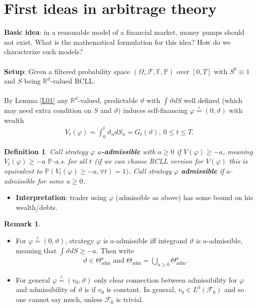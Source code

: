 \documentclass[12pt,a4paper, twoside]{article}
\newtheorem{defn}{Definition}[section]
\theoremstyle{definition}
\newtheorem{rem}{Remark}[section]
\newcommand{\PP}{\mathbb{P}} %
\newcommand{\teq}{\overset{\wedge}{=}}
\begin{document}
\section{First ideas in arbitrage theory}
\textbf{Basic idea}: in a reasonable model of a financial market, money pumps should not exist. What is the mathematical formulation for this idea? How do we characterize such models?\\
\\
\textbf{Setup}: Given a filtered probability space $( \Omega, \mathcal{F}, \mathbb{F}, \PP)$ over $[0,T]$ with $S^0 \equiv 1$ and $S$ being $\mathbb{R}^d$-valued RCLL. 
\\\\
By Lemma \ref{L01} any $\mathbb{R}^d$-valued, predictable $\vartheta$ with $\int \vartheta dS$ well defined (which may need extra condition on $S$ and $\vartheta)$ induces self-financing $\varphi \teq (0, \vartheta)$ with wealth 
\begin{align*}
V_t( \varphi) = \int_0^t \vartheta_u dS_u = G_t( \vartheta), \ 0 \leq t \leq T.
\end{align*}
\begin{defn} Call strategy $\varphi$ \textbf{$a$-admissible} with $a \geq 0$ if $V( \varphi) \geq -a$, meaning $V_t( \varphi) \geq - a$ $\PP$-a.s. for all $t$ (if we can choose RCLL version for $V(\varphi)$ this is equivalent to $\mathbb{P}( V_t( \varphi) \geq - a, \forall t)=1)$. Call strategy $\varphi$ \textbf{admissible} if $a$-admissible for some $a \geq 0$. 
\end{defn}
\begin{itemize}
\item \textbf{Interpretation}: trader using $\varphi$ (admissible as above) has some bound on his wealth/debts. 
\end{itemize}
\begin{rem} \
\begin{itemize}
\item For $\varphi \teq (0, \vartheta)$, strategy $\varphi$ is $a$-admissible iff integrand $\vartheta$ is $a$-admissible, meaning that $\int \vartheta dS \geq -a$. Then write 
\begin{align*}
\vartheta \in \Theta_{\text{adm}}^a \text{ and } \Theta_{\text{adm}} = \bigcup_{a \geq 0 } \Theta_{\text{adm}}^a.
\end{align*}
\item For general $\varphi \teq (v_0, \vartheta)$ only clear connection between admissibility for $\varphi$ and admissibility of $\vartheta$ is if $v_0$ is constant. In general, $v_0 \in L^0( \mathcal{F}_0)$ and so one cannot say much, unless $\mathcal{F}_0$ is trivial. 
\end{itemize} 
\end{rem}
\end{document}
